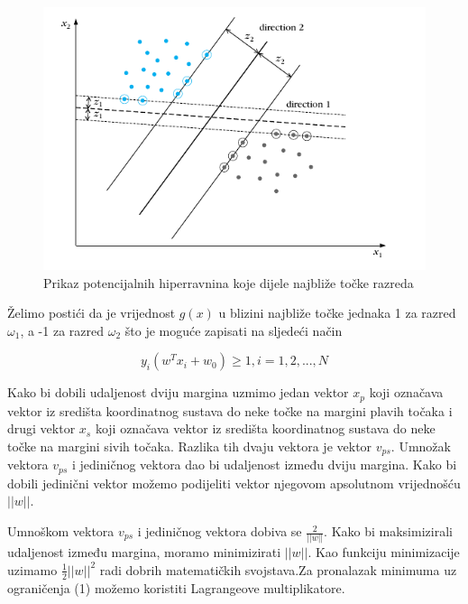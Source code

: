 \documentclass[times, utf8, zavrsni]{fer}
\begin{document}
\begin{figure}[htbp]
\centering
\includegraphics[scale=0.5]{img/slika10.png}
\caption{Prikaz potencijalnih hiperravnina koje dijele najbliže točke razreda}
\end{figure}

\newpage

Želimo postići da je vrijednost \(g(x)\) u blizini najbliže točke jednaka 1 za razred \(\omega_1\), a
-1 za razred \(\omega_2\) što je moguće zapisati na sljedeći način

\begin{equation}
y_i(w^Tx_i + w_0) \ge 1, i = 1,2,...,N
\end{equation}

Kako bi dobili udaljenost dviju margina uzmimo jedan vektor \(x_p\) koji označava 
vektor iz središta koordinatnog sustava do neke točke na margini plavih točaka i 
drugi vektor \(x_s\) koji označava vektor iz središta koordinatnog sustava do neke točke 
na margini sivih točaka. Razlika tih dvaju vektora je vektor \(v_{ps}\). Umnožak vektora 
\(v_{ps}\) i jediničnog vektora dao bi udaljenost između dviju margina. Kako bi dobili 
jedinični vektor možemo podijeliti vektor  njegovom apsolutnom vrijednošću \(\left| \left| w \right| \right|\). 

\bigbreak

Umnoškom vektora \(v_{ps}\) i jediničnog vektora dobiva se \(\frac{2}{\left| \left| w \right| \right|}\).
Kako bi maksimizirali udaljenost između margina, moramo minimizirati \(\left| \left| w \right| \right|\). 
Kao funkciju minimizacije uzimamo \(\frac{1}{2}\left| \left| w \right| \right|^2\) radi dobrih matematičkih
svojstava.Za pronalazak minimuma uz ograničenja (1) možemo koristiti Lagrangeove multiplikatore. 
\end{document}
